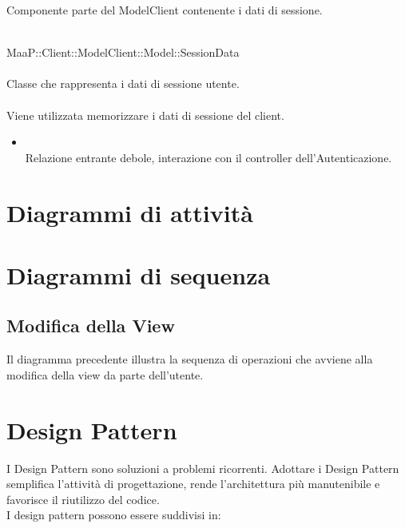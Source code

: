 Componente parte del ModelClient contenente i dati di sessione.

	\\
	MaaP::Client::ModelClient::Model::SessionData\\
	\\
	Classe che rappresenta i dati di sessione utente.\\
	\\
	Viene utilizzata memorizzare i dati di sessione del client.\\
	\begin{itemize}
	\item{}\\
	Relazione entrante debole, interazione con il controller dell'Autenticazione.
	\end{itemize}



\newpage
\section{Diagrammi di attività}


\section{Diagrammi di sequenza}
\subsection{Modifica della View}
Il diagramma precedente illustra la sequenza di operazioni che avviene alla modifica della view da parte dell'utente.

\newpage
\section{Design Pattern}
I Design Pattern sono soluzioni a problemi ricorrenti. Adottare i Design Pattern semplifica l'attività di progettazione, rende l'architettura più manutenibile e favorisce il riutilizzo del codice.\\
I design pattern possono essere suddivisi in:

